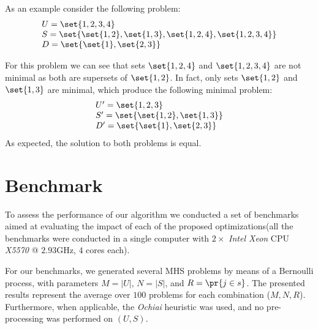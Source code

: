 As an example consider the following problem:
\begin{equation}
  \begin{array}{l}
    U = \set{1,2,3,4}\\
    S = \set{\set{1,2}, \set{1,3},\set{1,2,4}, \set{1,2,3,4}}\\
    D = \set{\set{1}, \set{2,3}}
  \end{array}
\end{equation}

For this problem we can see that sets $\set{1,2,4}$ and
$\set{1,2,3,4}$ are not minimal as both are supersets of $\set{1,2}$.
%
In fact, only sets $\set{1,2}$ and $\set{1,3}$ are minimal, which
produce the following minimal problem:
\begin{equation}
  \begin{array}{l}
    U^\prime = \set{1,2,3}\\
    S^\prime = \set{\set{1,2}, \set{1,3}}\\
    D^\prime = \set{\set{1}, \set{2,3}}
  \end{array}
\end{equation}
\noindent
As expected, the solution to both problems is equal.




\section{Benchmark}
\label{sec:mhs2o:results}
To assess the performance of our algorithm we conducted a set of
benchmarks aimed at evaluating the impact of each of the proposed
optimizations(all the benchmarks were conducted in a single computer
with $2\times$ \emph{Intel Xeon} \ac{CPU} \emph{X5570} @ $2.93$GHz,
$4$ cores each).
%

For our benchmarks, we generated several \ac{MHS} problems by means of
a Bernoulli process, with parameters $M = |U|$, $N = |S|$, and
$R = \pr{j \in s}$.
%
The presented results represent the average over $100$ problems for
each combination ($M, N, R$).
%
Furthermore, when applicable, the \textit{Ochiai} heuristic was used,
and no pre-processing was performed on $(U,S)$.


